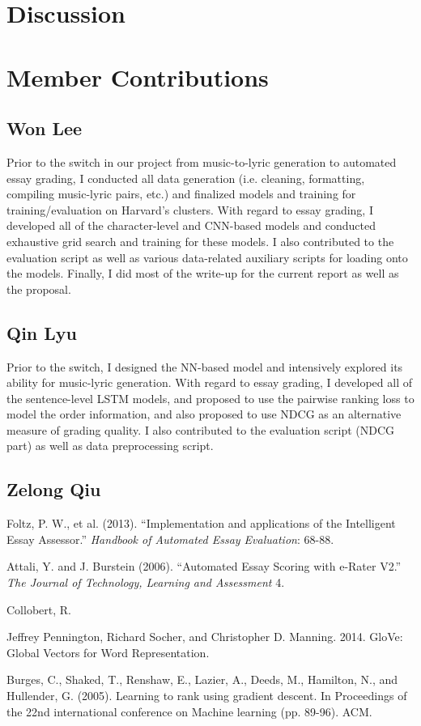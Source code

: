 \documentclass[10pt,psamsfonts]{amsart}
\theoremstyle{definition}
\theoremstyle{remark}
\numberwithin{equation}{section}
\begin{document}
\section*{Discussion}

\section*{Member Contributions}

\subsection*{Won Lee}

Prior to the switch in our project from music-to-lyric generation to automated essay grading, I conducted all data generation (i.e. cleaning, formatting, compiling music-lyric pairs, etc.) and finalized models and training for training/evaluation on Harvard's clusters. With regard to essay grading, I developed all of the character-level and CNN-based models and conducted exhaustive grid search and training for these models. I also contributed to the evaluation script as well as various data-related auxiliary scripts for loading onto the models. Finally, I did most of the write-up for the current report as well as the proposal.

\subsection*{Qin Lyu}

Prior to the switch, I designed the NN-based model and intensively explored its ability for music-lyric generation. With regard to essay grading, I developed all of the sentence-level LSTM models, and proposed to use the pairwise ranking loss to model the order information, and also proposed to use NDCG as an alternative measure of grading quality. I also contributed to the evaluation script (NDCG part) as well as data preprocessing script.

\subsection*{Zelong Qiu}

\begin{thebibliography}{99}
Foltz, P. W., et al. (2013). ``Implementation and applications of the Intelligent Essay Assessor.'' {\em Handbook of Automated Essay Evaluation}: 68-88.

Attali, Y. and J. Burstein (2006). ``Automated Essay Scoring with e-Rater V2.'' {\em The Journal of Technology, Learning and Assessment} 4.

Collobert, R.

Jeffrey Pennington, Richard Socher, and Christopher D. Manning. 2014. GloVe: Global Vectors for Word Representation.

Burges, C., Shaked, T., Renshaw, E., Lazier, A., Deeds, M., Hamilton, N., and Hullender, G. (2005). Learning to rank using gradient descent. In Proceedings of the 22nd international conference on Machine learning (pp. 89-96). ACM.


\end{thebibliography}
\end{document}
